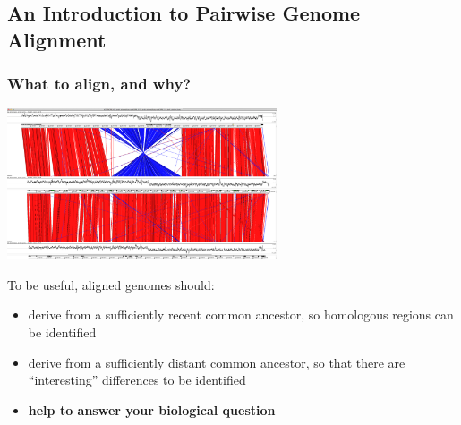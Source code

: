 

\subsection{An Introduction to Pairwise Genome Alignment}

\begin{frame}
  \frametitle{What to align, and why?}
  \begin{center}
    \includegraphics[width=0.6\textwidth]{images/act_comparison}
  \end{center}  
  To be useful, aligned genomes should:
  \begin{itemize}
    \item derive from a sufficiently recent common ancestor, so homologous regions can be identified
    \item derive from a sufficiently distant common ancestor, so that there are ``interesting'' differences to be identified
    \item \textbf{help to answer your biological question} 
  \end{itemize}
\end{frame}

